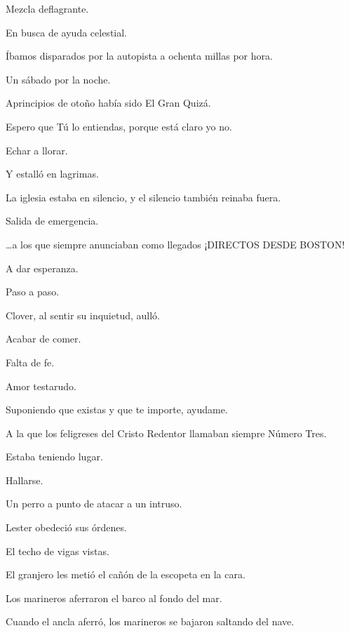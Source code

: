 \sk
Mezcla deflagrante. 

\sk
En busca de ayuda celestial.

\sk
Íbamos disparados por la autopista a ochenta millas por hora.

\sk
Un sábado por la noche.

\sk
Aprincipios de otoño había sido El Gran Quizá. 

\sk
Espero que Tú lo entiendas, porque está claro yo no.

\sk
Echar a llorar. 

\sk
Y estalló en lagrimas. 

\sk
La iglesia estaba en silencio, y el silencio también reinaba fuera.

\sk
Salida de emergencia. 

\sk
\ldots{}a los que siempre anunciaban como llegados ¡DIRECTOS DESDE BOSTON!

\sk
A dar esperanza. 

\sk
Paso a paso. 

\sk
Clover, al sentir su inquietud, aulló. 

\sk
Acabar de comer.

\sk
Falta de fe. 

\sk
Amor testarudo. 

\sk
Suponiendo que existas y que te importe, ayudame.

\sk
A la que los feligreses del Cristo Redentor llamaban siempre Número Tres.

\sk
Estaba teniendo lugar. 

\sk
Hallarse. 

\sk
Un perro a punto de atacar a un intruso.

\sk
Lester obedeció sus órdenes.

\sk
El techo de vigas vistas.

\sk
El granjero les metió el cañón de la escopeta en la cara. 

\sk
Los marineros aferraron el barco al fondo del mar. 

\sk
Cuando el ancla aferró, los marineros se bajaron saltando del nave. 

